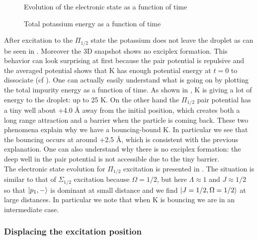 \begin{figure}[h!]
\centering
	\begin{minipage}[c]{0.48\linewidth}
		
		\vspace{0.2\baselineskip}
		\caption{Evolution of the electronic state as a function of time\label{fig:4P-p12-n-proj}}
	\end{minipage}
\hfill
	\begin{minipage}[c]{0.48\linewidth}
		
		\vspace{0.2\baselineskip}
		\caption{Total potassium energy as a function of time\label{fig:4P-p12-n-energy}}
	\end{minipage}
\end{figure}
	
After excitation to the $\Pi_{1/2}$ state the potassium does not leave the droplet as can be seen in .
Moreover the 3D snapshot  shows no exciplex formation. 
This behavior can look surprising at first  because  the pair potential is repulsive and the averaged potential shows that K has enough potential energy at $t=0$ to dissociate (cf ). 
One can actually easily understand what is going on by plotting the total impurity energy as a function of time.
As shown in , K is giving a lot of energy to the droplet: up to 25 K. 
On the other hand the $\Pi_{1/2}$ pair potential has a tiny well about +4.0 \AA{} away from the initial position, which creates both a long range attraction and a barrier when the particle is coming back. 
These two phenomena explain why we have a bouncing-bound K.
In particular we see that the bouncing occurs at around +2.5 \AA{}, which is consistent with the previous explanation. 
One can also understand why there is no exciplex formation: the deep well in the pair potential is not accessible due to the tiny barrier.\\

The electronic state evolution for $\Pi_{1/2}$ excitation is presented in .
The situation is similar to that of $\Sigma_{1/2}$ excitation because $\Omega=1/2$, but here $\Lambda \approx 1$ and $J\approx 1/2$ so that $\ket{p_1,-}$ is dominant at small distance and we find $\ket{J=1/2,\Omega=1/2}$ at large distances.
In particular we note that when K is bouncing we are in an intermediate case.

\subsubsection{Displacing the excitation position}

